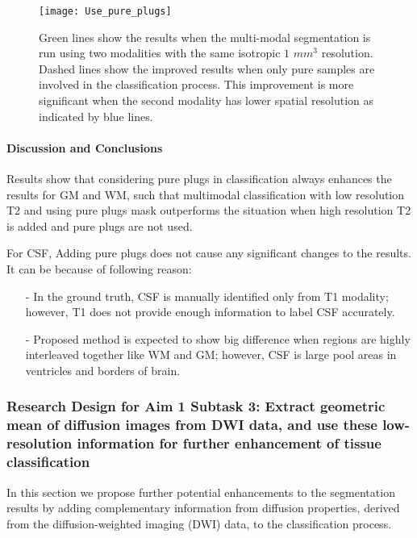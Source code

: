 \begin{figure}
\centering
\texttt{[image: Use\_pure\_plugs]}\
\centering
\caption{Green lines show the results when the multi-modal segmentation is run using two modalities with the same isotropic $1$ $mm^3$ resolution. Dashed lines show the improved results when only pure samples are involved in the classification process. This improvement is more significant when the second modality has lower spatial resolution as indicated by blue lines.} 
\label{fig:Use_pure_plugs}
\end{figure}
 
\paragraph{Discussion and Conclusions}

Results show that considering pure plugs in classification always enhances the results for GM and WM, such that multimodal classification with low resolution T2 and using pure plugs mask outperforms the situation when high resolution T2 is added and pure plugs are not used.

For CSF, Adding pure plugs does not cause any significant changes to the results. It can be because of following reason:
\begin{itemize}
    \item[-] In the ground truth, CSF is manually identified only from T1 modality; however, T1 does not provide enough information to label CSF accurately.
    \item[-] Proposed method is expected to show big difference when regions are highly interleaved together like WM and GM; however, CSF is large pool areas in ventricles and borders of brain.
\end{itemize}


\subsubsection{Research Design for Aim 1 Subtask 3: Extract geometric mean of diffusion images from DWI data, and use these low-resolution information for further enhancement of tissue classification}
\label{section:Aim1Subtask3ResearchDesign} %

In this section we propose further potential enhancements to the segmentation results by adding complementary information from diffusion properties, derived from the diffusion-weighted imaging (DWI) data, to the classification process.

